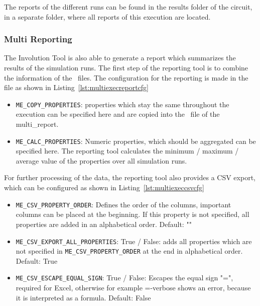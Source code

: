 The reports of the different runs can be found in the results folder of
the circuit, in a separate folder, where all reports of this execution
are located.

\subsubsection{Multi Reporting}\label{sec:man-multi-multi-reporting}

The Involution Tool is also able to generate a report which summarizes
the results of the simulation runs. The first step of the reporting tool
is to combine the information of the  \resultsjson\ files. The
configuration for the reporting is made in the  file as 
shown in Listing~\ref{lst:multiexecreportcfg}


\begin{itemize}
\item
  \lstinline|ME_COPY_PROPERTIES|: properties which stay the same throughout the
  execution can be specified here and are copied into the \resultsjson\ file of 
  the multi\_report.
\item
  \lstinline|ME_CALC_PROPERTIES|: Numeric properties, which should be aggregated
  can be specified here. The reporting tool calculates the minimum /
  maximum / average value of the properties over all simulation runs.
\end{itemize}

For further processing of the data, the reporting tool also provides a
CSV export, which can be configured as shown in 
Listing~\ref{lst:multiexeccsvcfg}


\begin{itemize}
\item
  \lstinline|ME_CSV_PROPERTY_ORDER|: Defines the order of the columns,
  important columns can be placed at the beginning. If this property is not 
  specified, all properties are added in an alphabetical order. Default: ""
\item
  \lstinline|ME_CSV_EXPORT_ALL_PROPERTIES|: True / False: adds all properties
  which are not specified in \lstinline|ME_CSV_PROPERTY_ORDER| at the end in
  alphabetical order. Default: True
\item
  \lstinline|ME_CSV_ESCAPE_EQUAL_SIGN|: True / False: Escapes the equal sign 
  "=", required for
  Excel, otherwise for example =-verbose shows an error, because it is
  interpreted as a formula. Default: False
\end{itemize}


